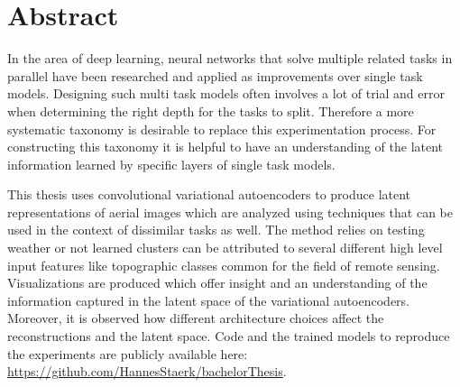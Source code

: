 \section{Abstract}


In the area of deep learning, neural networks that solve multiple related tasks in parallel have been
researched and applied as improvements over single task models. Designing such multi task
models often involves a lot of trial and error when determining the right depth for the tasks
to split. Therefore a more systematic taxonomy is desirable to replace this experimentation process.
For constructing this taxonomy it is helpful to have an understanding of the latent information 
learned by specific layers of single task models.

This thesis uses convolutional variational autoencoders to produce latent representations of 
aerial images which are analyzed using techniques that can be used in the context of dissimilar
tasks as well. The method relies on testing weather or not learned clusters can be attributed to
several different high level input features like topographic classes common for the field
of remote sensing. Visualizations are produced which offer insight and an understanding of the
information captured in the latent space of the variational autoencoders.
Moreover, it is observed how different architecture choices affect the reconstructions and the
latent space.
Code and the trained models to reproduce the experiments are publicly available here:
\href{https://github.com/HannesStaerk/bachelorThesis}{https://github.com/HannesStaerk/bachelorThesis}.



